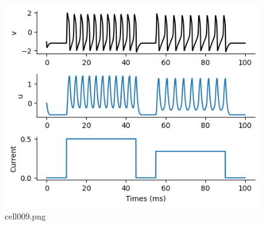 \begin{figure}[ht]
	\centering
	\includegraphics[scale=0.8, max width=\linewidth]{./fig/neuron-model/fhn/cell009.png}
	\caption{cell009.png}
	\label{cell009.png}
\end{figure}
